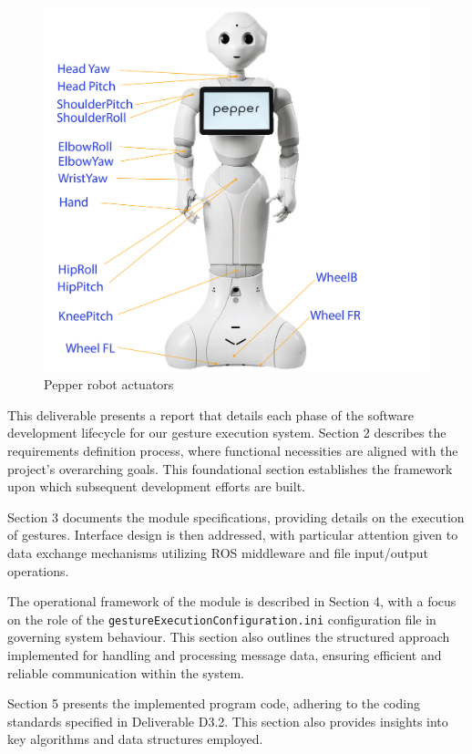 \documentclass{CSSRforAfrica}
\begin{document}
\begin{figure}[!hbpt]
\centering
\includegraphics[scale=0.115]{Pepper_actuator.png}
\caption{Pepper robot actuators}
\label{fig:Pepper_actuator}
\end{figure}


This deliverable presents a report that details each phase of the software development lifecycle for our gesture execution system. Section 2 describes the requirements definition process, where functional necessities are aligned with the project's overarching goals. This foundational section establishes the framework upon which subsequent development efforts are built.

Section 3 documents the module specifications, providing details on the execution of gestures. Interface design is then addressed, with particular attention given to data exchange mechanisms utilizing ROS middleware and file input/output operations.

The operational framework of the module is described in Section 4, with a focus on the role of the \texttt{gestureExecutionConfiguration.ini} configuration file in governing system behaviour. This section also outlines the structured approach implemented for handling and processing message data, ensuring efficient and reliable communication within the system. 

Section 5 presents the implemented program code, adhering to the coding standards specified in Deliverable D3.2. This section also provides insights into key algorithms and data structures employed. 
\end{document}

